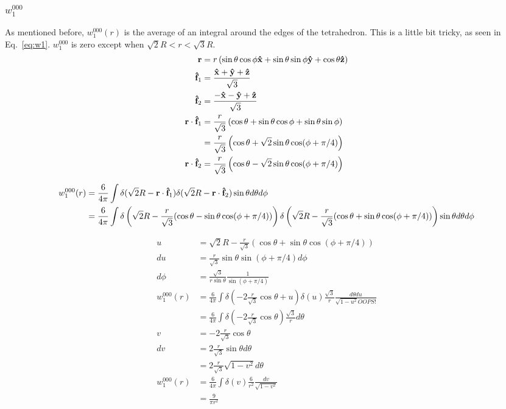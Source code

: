 \documentclass[letterpaper,twocolumn,amsmath,amssymb,pre]{revtex4-1}
\begin{document}
\subsubsection{$w_1^{000}$}
As mentioned before, $w_1^{000}(r)$ is the average of an integral
around the edges of the tetrahedron.  This is a little bit tricky, as
seen in Eq.~\ref{eq:w1}.  $w_1^{000}$ is zero except when $\sqrt{2}R <
r < \sqrt{3}R$.
\begin{align}
  \mathbf{r} &= r\left(
  \sin\theta\cos\phi\mathbf{\hat{x}} +
  \sin\theta\sin\phi\mathbf{\hat{y}} +
  \cos\theta\mathbf{\hat{z}} \right)
  \\
  \mathbf{\hat{f}}_1 &= \frac{\mathbf{\hat{x}}+\mathbf{\hat{y}}+\mathbf{\hat{z}}}{\sqrt{3}} \\
  \mathbf{\hat{f}}_2 &= \frac{-\mathbf{\hat{x}}-\mathbf{\hat{y}}+\mathbf{\hat{z}}}{\sqrt{3}} \\
  \mathbf{r}\cdot\mathbf{\hat{f}}_1 &=
  \frac{r}{\sqrt{3}}\left(
  \cos\theta+\sin\theta\cos\phi + \sin\theta\sin\phi
  \right)
  \\
  &= \frac{r}{\sqrt{3}}\left(
  \cos\theta+\sqrt{2}\sin\theta\cos(\phi+\pi/4)
  \right)
  \\
  \mathbf{r}\cdot\mathbf{\hat{f}}_2 &=
  \frac{r}{\sqrt{3}}\left(
  \cos\theta-\sqrt{2}\sin\theta\cos(\phi+\pi/4)
  \right)
\end{align}
\begin{widetext}
\begin{align}
  w_1^{000}(r) &= \frac{6}{4\pi}\int
  \delta(\sqrt{2}R - \mathbf{r}\cdot \mathbf{\hat{f}}_1)
  \delta(\sqrt{2}R - \mathbf{r}\cdot \mathbf{\hat{f}}_2)
  \sin\theta d\theta d\phi
  \\
  &= \frac{6}{4\pi}\int
  \delta\left(\sqrt{2}R
  - \frac{r}{\sqrt{3}}(\cos\theta-\sin\theta\cos(\phi+\pi/4))\right)
  \delta\left(\sqrt{2}R
  - \frac{r}{\sqrt{3}}(\cos\theta+\sin\theta\cos(\phi+\pi/4))\right)
  \sin\theta d\theta d\phi
\end{align}
\end{widetext}
\begin{align}
  u &= \sqrt{2}R -\frac{r}{\sqrt{3}}(\cos\theta + \sin\theta\cos(\phi+\pi/4)) \\
  du &= \frac{r}{\sqrt{3}}\sin\theta\sin(\phi+\pi/4)d\phi \\
  d\phi &= \frac{\sqrt{3}}{r\sin\theta}\frac{1}{\sin(\phi+\pi/4)}
  \\
  w_1^{000}(r)
  &= \frac{6}{4\pi}\int
  \delta\left(-2\frac{r}{\sqrt{3}}\cos\theta+u\right)
  \delta(u)
   \frac{\sqrt{3}}{r}\frac{ d\theta du}{\sqrt{1-u^2}OOPS!}
  \\
  &= \frac{6}{4\pi}\int
  \delta\left(-2\frac{r}{\sqrt{3}}\cos\theta\right)
   \frac{\sqrt{3}}{r}d\theta
   \\
  v &= -2\frac{r}{\sqrt{3}}\cos\theta \\
  dv &= 2\frac{r}{\sqrt{3}}\sin\theta d\theta \\
  &= 2\frac{r}{\sqrt{3}}\sqrt{1-v^2}d\theta \\
  w_1^{000}(r)
  &= \frac{6}{4\pi}\int
  \delta\left(v\right)
   \frac{6}{r^2}\frac{dv}{\sqrt{1-v^2}} \\
   &= \frac{9}{\pi r^2}
\end{align}
\end{document}
